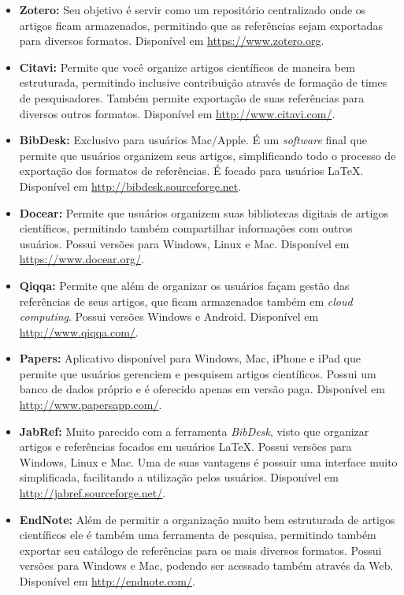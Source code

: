 \begin{textnew}
\begin{itemize}
    \item \textbf{Zotero:} Seu objetivo é servir como um repositório centralizado onde os artigos ficam armazenados, permitindo que as referências sejam exportadas para diversos formatos. Disponível em \url{https://www.zotero.org}.
    \item \textbf{Citavi:} Permite que você organize artigos científicos de maneira bem estruturada, permitindo inclusive contribuição através de formação de times de pesquisadores. Também permite exportação de suas referências para diversos outros formatos. Disponível em \url{http://www.citavi.com/}.
    \item \textbf{BibDesk:} Exclusivo para usuários Mac/Apple. É um \emph{software} final que permite que usuários organizem seus artigos, simplificando todo o processo de exportação dos formatos de referências. É focado para usuários \LaTeX. Disponível em \url{http://bibdesk.sourceforge.net}.
    \item \textbf{Docear:} Permite que usuários organizem suas bibliotecas digitais de artigos científicos, permitindo também compartilhar informações com outros usuários. Possui versões para Windows, Linux e Mac. Disponível em \url{https://www.docear.org/}.
    \item \textbf{Qiqqa:} Permite que além de organizar os usuários façam gestão das referências de seus artigos, que ficam armazenados também em \emph{cloud computing}. Possui versões Windows e Android. Disponível em \url{http://www.qiqqa.com/}.
    \item \textbf{Papers:} Aplicativo disponível para Windows, Mac, iPhone e iPad que permite que usuários gerenciem e pesquisem artigos científicos. Possui um banco de dados próprio e é oferecido apenas em versão paga. Disponível em \url{http://www.papersapp.com/}.
    \item \textbf{JabRef:} Muito parecido com a ferramenta \emph{BibDesk}, visto que organizar artigos e referências focados em usuários \LaTeX. Possui versões para Windows, Linux e Mac. Uma de suas vantagens é possuir uma interface muito simplificada, facilitando a utilização pelos usuários. Disponível em \url{http://jabref.sourceforge.net/}.
    \item \textbf{EndNote:} Além de permitir a organização muito bem estruturada de artigos científicos ele é também uma ferramenta de pesquisa, permitindo também exportar seu catálogo de referências para os mais diversos formatos. Possui versões para Windows e Mac, podendo ser acessado também através da Web. Disponível em \url{http://endnote.com/}.
\end{itemize}

\end{textnew}

